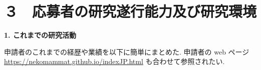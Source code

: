 \documentclass[11pt,a4paper,uplatex,dvipdfmx]{ujarticle} 		%
\newcommand{\研究課題名}{曲率ゆらぎの統計と原始ブラックホール量の精密対応}
\newcommand{\研究機関名}{名古屋大学}
\newcommand{\研究代表者氏名}{多田祐一郎}
\newcommand{\研究期間の最終元号年度}{4}  %
\begin{document}



\section{３　応募者の研究遂行能力及び研究環境}


\begin{mdframed}[roundcorner=0.5zw,
	innertopmargin=0.8zw,innerbottommargin=0.8zw,
	linecolor=black!50,linewidth=0.2zw,
	backgroundcolor=black!10]
	{\bfseries\gtfamily\sffamily\large 1. これまでの研究活動}
\end{mdframed}

\noindent
申請者のこれまでの経歴や業績を以下に簡単にまとめた. 
申請者の web ページ \url{https://nekomammat.github.io/indexJP.html} も合わせて参照されたい.
\end{document}
